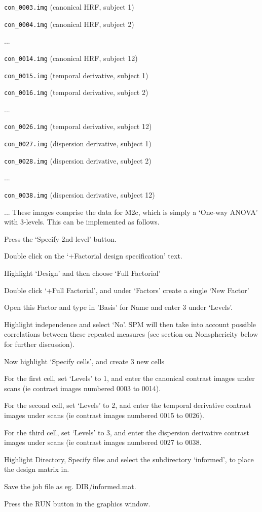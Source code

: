 \bi
\item{\verb!con_0003.img!		(canonical HRF, subject 1)}
\item{\verb!con_0004.img!		(canonical HRF, subject 2)}
\item{...}
\item{\verb!con_0014.img!		(canonical HRF, subject 12)}
\item{\verb!con_0015.img!		(temporal derivative, subject 1)}
\item{\verb!con_0016.img!		(temporal derivative, subject 2)}
\item{...}
\item{\verb!con_0026.img!		(temporal derivative, subject 12)}
\item{\verb!con_0027.img!		(dispersion derivative, subject 1)}
\item{\verb!con_0028.img!		(dispersion derivative, subject 2)}
\item{...}
\item{\verb!con_0038.img!		(dispersion derivative, subject 12)}
\item{...}
\ei
These images comprise the data for M2c, which is simply a `One-way ANOVA' with 3-levels. This can be implemented as follows.
\bi
\item{Press the `Specify 2nd-level' button.}
\item{Double click on the `+Factorial design specification' text.}
\item{Highlight `Design' and then choose `Full Factorial'}
\item{Double click `+Full Factorial', and under `Factors' create a single `New Factor'}
\item{Open this Factor and type in 'Basis' for Name and enter 3 under `Levels'.}
\item{Highlight independence and select `No'. SPM will then take into account possible correlations between these repeated measures (see section on Nonsphericity below for further discussion).}
\item{Now highlight `Specify cells', and create 3 new cells}  
\item{For the first cell, set `Levels' to 1, and enter the canonical contrast images under scans (ie contrast images numbered 0003 to 0014).}    
\item{For the second cell, set `Levels' to 2, and enter the 
temporal derivative contrast images under scans (ie contrast images numbered 0015 to 0026).}   
\item{For the third cell, set `Levels' to 3, and enter the 
dispersion derivative contrast images under scans (ie contrast images numbered 0027 to 0038.}
\item{Highlight Directory, Specify files and select the 
subdirectory `informed', to place the design matrix in.}
\item{Save the job file as eg. {\sf DIR/informed.mat}}.
\item{Press the RUN button in the graphics window.}
\ei

